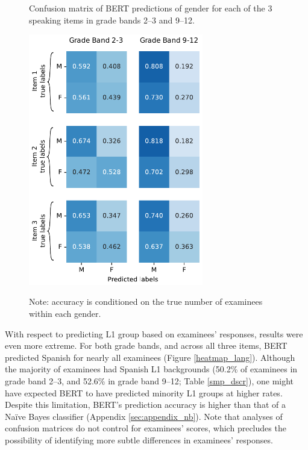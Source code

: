 \documentclass [PhD] {uclathes}
\begin{document}
\begin{figure}[!htb]
    \centering
    \caption{Confusion matrix of BERT predictions of gender for each of the 3 speaking items in grade bands 2–3 and 9–12.}    
    \includegraphics[width=3in]{figures/20230516_gender805_heatmap_edit.pdf}
    \label{heatmap_gend}
\caption*{\small Note: accuracy is conditioned on the true number of examinees within each gender.}
\end{figure}

With respect to predicting L1 group based on examinees’ responses, results were even more extreme. For both grade bands, and across all three items, BERT predicted Spanish for nearly all examinees (Figure \ref{heatmap_lang}). Although the majority of examinees had Spanish L1 backgrounds (50.2\% of examinees in grade band 2–3, and 52.6\% in grade band 9–12; Table \ref{smp_dscr}), one might have expected BERT to have predicted minority L1 groups at higher rates. Despite this limitation, BERT's prediction accuracy is higher than that of a Naïve Bayes classifier (Appendix \ref{sec:appendix_nb}). Note that analyses of confusion matrices do not control for examinees' scores, which precludes the possibility of identifying more subtle differences in examinees’ responses. 
\end{document}
